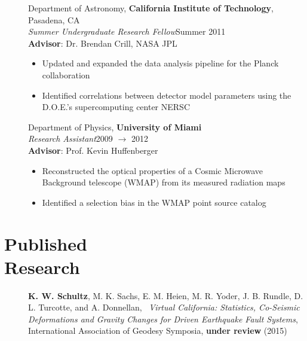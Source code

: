\documentclass[margin,line]{resume}
\begin{document}
\begin{resume}
\begin{description}
    \item[] \normalsize Department of Astronomy, \textbf{California Institute of Technology}, Pasadena, CA \\
    \emph{Summer Undergraduate Research Fellow}\hfill Summer 2011 \\
        \textbf{Advisor}: Dr. Brendan Crill, NASA JPL
    \begin{itemize}
        \item Updated and expanded the data analysis pipeline for the Planck collaboration
        \item Identified correlations between detector model parameters using the D.O.E.'s supercomputing center NERSC
        \end{itemize} \vspace{1mm}

    \item[] \normalsize Department of Physics, \textbf{University of Miami} \\
    \emph{Research Assistant}\hfill 2009 $\rightarrow$ 2012 \\
        \textbf{Advisor}: Prof. Kevin Huffenberger
    \begin{itemize} 
        \item Reconstructed the optical properties of a Cosmic Microwave Background telescope (WMAP) from its measured radiation maps
        \item Identified a selection bias in the WMAP point source catalog 
    \end{itemize} \vspace{1mm} 
    
\end{description}


\section{\mysidestyle \textbf{Published} \\ \textbf{Research}}

\begin{description}

\item[] \normalsize \textbf{K. W. Schultz}, M. K. Sachs, E. M. Heien, M. R. Yoder, J. B. Rundle, D. L. Turcotte, and A. Donnellan, \ \emph{Virtual California: Statistics, Co-Seismic Deformations and Gravity Changes for Driven Earthquake Fault Systems}, International Association of Geodesy Symposia, \textbf{under review} (2015) \\


\end{description}
\end{resume}
\end{document}
